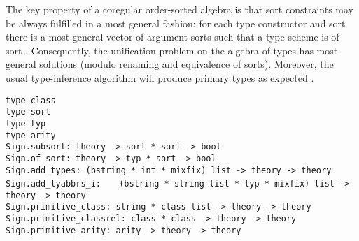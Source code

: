 \begin{isabellebody}
\begin{isamarkuptext}
  The key property of a coregular order-sorted algebra is that sort
  constraints may be always fulfilled in a most general fashion: for
  each type constructor  and sort  there is a
  most general vector of argument sorts  such that a type scheme  is
  of sort .  Consequently, the unification problem on the
  algebra of types has most general solutions (modulo renaming and
  equivalence of sorts).  Moreover, the usual type-inference algorithm
  will produce primary types as expected \cite{nipkow-prehofer}.%
\end{isamarkuptext}%
\isamarkuptrue%
%
\isadelimmlref
%
\endisadelimmlref
%
\isatagmlref
%
\begin{isamarkuptext}%
\begin{mldecls}
  \verb|type class| \\
  \verb|type sort| \\
  \verb|type typ| \\
  \verb|type arity| \\
  \verb|Sign.subsort: theory -> sort * sort -> bool| \\
  \verb|Sign.of_sort: theory -> typ * sort -> bool| \\
  \verb|Sign.add_types: (bstring * int * mixfix) list -> theory -> theory| \\
  \verb|Sign.add_tyabbrs_i: |\isasep\isanewline%
\verb|  (bstring * string list * typ * mixfix) list -> theory -> theory| \\
  \verb|Sign.primitive_class: string * class list -> theory -> theory| \\
  \verb|Sign.primitive_classrel: class * class -> theory -> theory| \\
  \verb|Sign.primitive_arity: arity -> theory -> theory| \\
  \end{mldecls}

  \begin{description}


\end{description}
\end{isamarkuptext}
\end{isabellebody}
